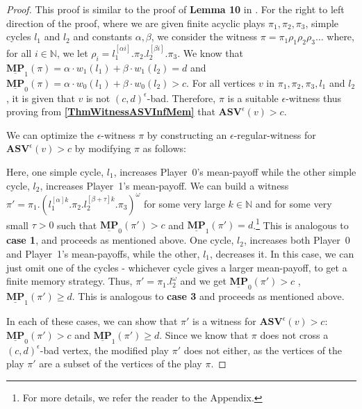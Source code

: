 \begin{proof}
This proof is similar to the proof of \textbf{Lemma 10} in \cite{FGR20}. 
For the right to left direction of the proof, where we are given finite acyclic plays $\pi_1, \pi_2, \pi_3$, simple cycles $l_1$ and $l_2$ and constants $\alpha, \beta$, we consider the witness $\pi = \pi_1\rho_1\rho_2\rho_3\dots$ where, for all $i \in \mathbb{N}$, we let $\rho_i = l_1^{[\alpha i]}.\pi_2.l_2^{[\beta i]}.\pi_3$. 
We know that $\underline{\mathbf{MP}}_1(\pi) = \alpha \cdot w_1(l_1) + \beta \cdot w_1(l_2) = d$ and $\underline{\mathbf{MP}}_0(\pi) = \alpha \cdot w_0(l_1) + \beta \cdot w_0(l_2) > c$. For all vertices $v$ in $\pi_1, \pi_2, \pi_3, l_1$ and $l_2$, it is given that $v$ is not $(c,d)^\epsilon$-bad. 
Therefore, $\pi$ is a suitable $\epsilon$-witness thus proving from \textbf{\cref{ThmWitnessASVInfMem}} that $\mathbf{ASV}^{\epsilon}(v) > c$.

We can optimize the $\epsilon$-witness $\pi$ by constructing an $\epsilon$-regular-witness for $\mathbf{ASV}^{\epsilon}(v) > c$ by modifying $\pi$ as follows:
\begin{caseof}
    Here, one simple cycle, $l_1$, increases Player~0's mean-payoff while the other simple cycle, $l_2$, increases Player~1's mean-payoff. We can build a witness $\pi' = \pi_1.(l_1^{[\alpha]k}.\pi_2.l_2^{[\beta+\tau]k}.\pi_3)^{\omega}$ for some very large $k \in \mathbb{N}$ and for some very small $\tau > 0$ such that $\underline{\mathbf{MP}}_0(\pi') > c$ and $\underline{\mathbf{MP}}_1(\pi') = d$.\footnote{For more details, we refer the reader to the Appendix.}
    This is analogous to \textbf{case 1}, and proceeds as mentioned above.
    One cycle, $l_2$, increases both Player~0 and Player~1's mean-payoffs, while the other, $l_1$, decreases it. In this case, we can just omit one of the cycles - whichever cycle gives a larger mean-payoff, to get a finite memory strategy. Thus, $\pi' = \pi_1.l_2^{\omega}$ and we get $\underline{\mathbf{MP}}_0(\pi') > c$ , $\underline{\mathbf{MP}}_1(\pi') \geqslant d$.
    This is analogous to \textbf{case 3} and proceeds as mentioned above.
\end{caseof}
In each of these cases, we can show that $\pi'$ is a witness for $\mathbf{ASV}^{\epsilon}(v) > c$: $\underline{\mathbf{MP}}_0(\pi') > c$ and $\underline{\mathbf{MP}}_1(\pi') \geqslant d$.
Since we know that $\pi$ does not cross a $(c,d)^{\epsilon}$-bad vertex, the modified play $\pi'$ does not either, as the vertices of the play $\pi'$ are a subset of the vertices of the play $\pi$. 


\end{proof}
